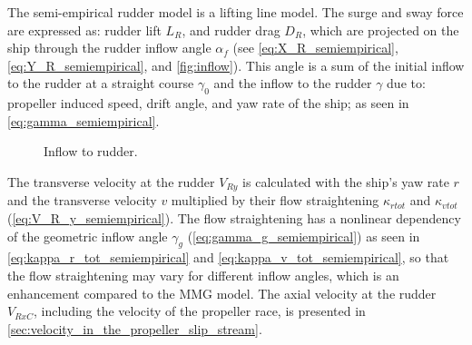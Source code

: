 The semi-empirical rudder model is a lifting line model. The surge and sway force are expressed as: rudder lift $L_R$, and rudder drag $D_R$, which are projected on the ship through the rudder inflow angle $\alpha_f$ (see \autoref{eq:X_R_semiempirical}, \autoref{eq:Y_R_semiempirical}, and \autoref{fig:inflow}).
This angle is a sum of the initial inflow to the rudder at a straight course $\gamma_0$ and the inflow to the rudder $\gamma$ due to: propeller induced speed, drift angle, and yaw rate of the ship; as seen in \autoref{eq:gamma_semiempirical}.
%
\begin{figure}[h]
    \centering
    
    \caption{Inflow to rudder.}
    \label{fig:inflow}
\end{figure}
%
\begin{equation}
    \label{eq:X_R_semiempirical}
    
\end{equation}
%
\begin{equation}
    \label{eq:Y_R_semiempirical}
    
\end{equation}
%
\begin{equation}
    \label{eq:alpha_f_semiempirical}
    
\end{equation}
%
\begin{equation}
    \label{eq:gamma_semiempirical}
    
\end{equation}
The transverse velocity at the rudder $V_{Ry}$ is calculated with the ship's yaw rate $r$ and the transverse velocity $v$ multiplied by their flow straightening $\kappa_{rtot}$ and $\kappa_{vtot}$ (\autoref{eq:V_R_y_semiempirical}). The flow straightening has a nonlinear dependency of the geometric inflow angle $\gamma_g$ (\autoref{eq:gamma_g_semiempirical}) as seen in \autoref{eq:kappa_r_tot_semiempirical} and \autoref{eq:kappa_v_tot_semiempirical}, so that the flow straightening may vary for different inflow angles, which is an enhancement compared to the MMG model.
The axial velocity at the rudder $V_{RxC}$, including the velocity of the propeller race, is presented in \autoref{sec:velocity_in_the_propeller_slip_stream}.
\begin{equation}
    \label{eq:V_R_y_semiempirical}
    
\end{equation}
